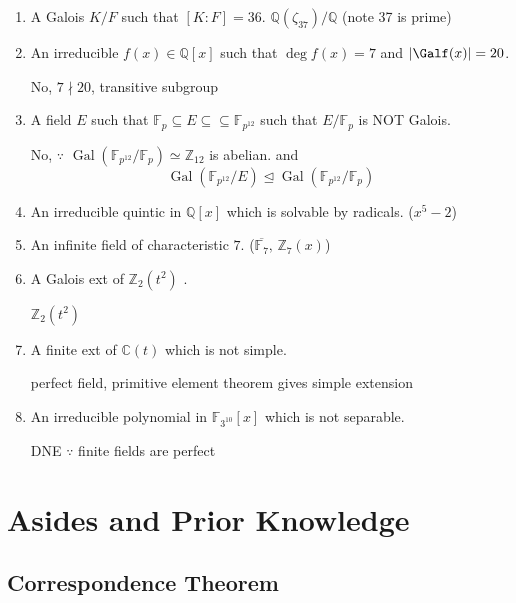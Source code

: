 \documentclass[notoc,notitlepage,nobib]{tufte-book}
\DeclareMathOperator{\Gal}{Gal}
\begin{document}
\begin{enumerate}
  \item A Galois $K / F$ such that $[K : F] = 36$.
    $\mathbb{Q}(\zeta_{37}) / \mathbb{Q}$ (note 37 is prime)
  \item An irreducible $f(x) \in \mathbb{Q}[x]$ such that $\deg f(x) = 7$ and
    $\abs{\Galf(x)} = 20$.

    No, $7 \nmid 20$, transitive subgroup
  \item A field  $E$ such that $\mathbb{F}_p \subseteq E \subseteq \subseteq
    \mathbb{F}_{p^{12}}$ such that $E / \mathbb{F}_p$ is NOT Galois.

    No, $\because$  $\Gal( \mathbb{F}_{p^{12}} / \mathbb{F}_p ) \simeq
    \mathbb{Z}_{12}$ is abelian. and
    \begin{equation*}
      \Gal( \mathbb{F}_{p^{12}} / E ) \trianglelefteq \Gal( \mathbb{F}_{p^{12}}
      / \mathbb{F}_p)
    \end{equation*}
  \item An irreducible quintic in $\mathbb{Q}[x]$ which is solvable by radicals.
    ($x^5 - 2$)
  \item An infinite field of characteristic $7$. ($\overline{\mathbb{F}_7}, \,
    \mathbb{Z}_7(x)$)
  \item A Galois ext of $\mathbb{Z}_2(t^2)$ .

    $\mathbb{Z}_2(t^2)$

  \item A finite ext of $\mathbb{C}(t)$ which is not simple.

    perfect field, primitive element theorem gives simple extension

  \item An irreducible polynomial in $\mathbb{F}_{3^{10}}[x]$ which is not
    separable.

    DNE $\because$ finite fields are perfect
\end{enumerate}



\appendix

\chapter{Asides and Prior Knowledge}%
\label{chp:asides_and_prior_knowledge}

\section{Correspondence Theorem}%
\label{sec:correspondence_theorem}
\end{document}
